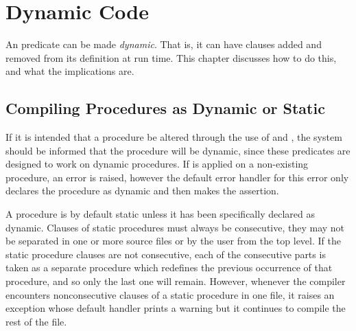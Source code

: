 %
% 
% 
% 
% 

\chapter{Dynamic Code}
\label{chapdynamic}

An {\eclipse} predicate can be made \emph{dynamic}.
That is, it can have clauses added and removed from its definition at run
time.
This chapter discusses how to do this, and what the implications are.

\section{Compiling Procedures as Dynamic or Static}
\label{compdynamic}

If it is intended that
a procedure be altered through the use of  and ,
the system should be informed that the procedure will be dynamic,
since these predicates are
designed to work on dynamic procedures. 
If  is applied on a non-existing procedure, an error
is raised, however the default error handler for this error
only declares the procedure as dynamic and then makes the assertion.

A procedure is by default static unless it has been specifically declared as
dynamic.
Clauses of static procedures must always be consecutive,
they may not
be separated in one or more source files or by the user from the top level.
If the static procedure clauses are not consecutive, each of the
consecutive parts is taken as a separate procedure which redefines
the previous occurrence of that procedure, and so only the last one will
remain.
However, whenever the compiler encounters nonconsecutive clauses of a static
procedure in one file, it raises an exception whose default handler
prints a warning but it continues to compile the rest of the file.

